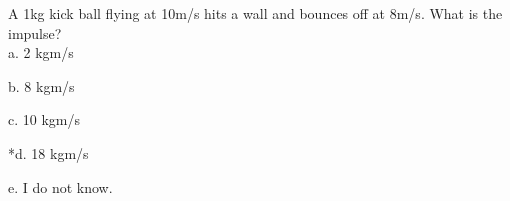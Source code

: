
A 1kg kick ball flying at 10m/s hits a wall and bounces off at 8m/s. What is the impulse?\\

a. 2 kgm/s

b. 8 kgm/s

c. 10 kgm/s

*d. 18 kgm/s

e. I do not know. 
